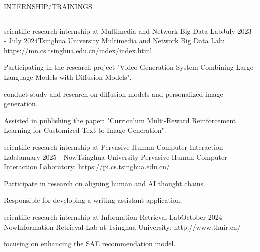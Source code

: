 \documentclass{resume} %
\renewenvironment{rSection}[1]{
\sectionskip
\textcolor{TsinghuaPurple}{\MakeUppercase{#1}}
\sectionlineskip
\hrule
\begin{list}{}{
\setlength{\leftmargin}{0em}
}
\item[]
}{
\end{list}
}
\begin{document}

\begin{rSection}{INTERNSHIP/TRAININGS}

\begin{rSubsection}{scientific research internship at Multimedia and Network Big Data Lab}{July 2023 - July 2024}{Tsinghua University Multimedia and Network Big Data Lab: https://mn.cs.tsinghua.edu.cn/index/index.html}{}              
\item Participating in the research project "Video Generation System Combining Large Language Models with Diffusion Models".  
\item conduct study and research on diffusion models and personalized image generation.
\item Assisted in publishing the paper: "Curriculum Multi-Reward Reinforcement Learning for Customized Text-to-Image Generation".
\end{rSubsection}  

\begin{rSubsection}{scientific research internship at Pervasive Human Computer Interaction Lab}{January 2025 - Now}{Tsinghua University Pervasive Human Computer Interaction Laboratory: https://pi.cs.tsinghua.edu.cn/}{}              
\item Participate in research on aligning human and AI thought chains.
\item Responsible for developing a writing assistant application.
\end{rSubsection}  

\begin{rSubsection}{scientific research internship at Information Retrieval Lab}{October 2024 - Now}{Information Retrieval Lab at Tsinghua University: http://www.thuir.cn/}{}              
\item focusing on enhancing the SAE recommendation model.
\end{rSubsection}  

\end{rSection}

  
\end{document}
